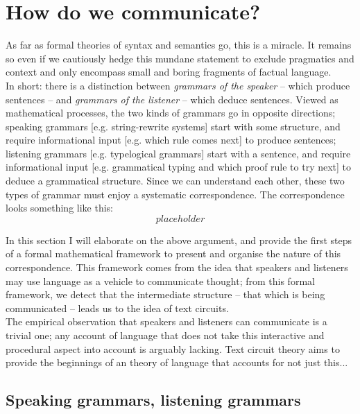 \section{How do we communicate?}

 As far as formal theories of syntax and semantics go, this is a miracle. It remains so even if we cautiously hedge this mundane statement to exclude pragmatics and context and only encompass small and boring fragments of factual language.\\

In short: there is a distinction between \emph{grammars of the speaker} -- which produce sentences -- and \emph{grammars of the listener} -- which deduce sentences. Viewed as mathematical processes, the two kinds of grammars go in opposite directions; speaking grammars [e.g. string-rewrite systems] start with some structure, and require informational input [e.g. which rule comes next] to produce sentences; listening grammars [e.g. typelogical grammars] start with a sentence, and require informational input [e.g. grammatical typing and which proof rule to try next] to deduce a grammatical structure. Since we can understand each other, these two types of grammar must enjoy a systematic correspondence. The correspondence looks something like this:\\

\[placeholder\]

In this section I will elaborate on the above argument, and provide the first steps of a formal mathematical framework to present and organise the nature of this correspondence. This framework comes from the idea that speakers and listeners may use language as a vehicle to communicate thought; from this formal framework, we detect that the intermediate structure -- that which is being communicated -- leads us to the idea of text circuits.\\

The empirical observation that speakers and listeners can communicate is a trivial one; any account of language that does not take this interactive and procedural aspect into account is arguably lacking. Text circuit theory aims to provide the beginnings of an theory of language that accounts for not just this...

\subsection{Speaking grammars, listening grammars}

